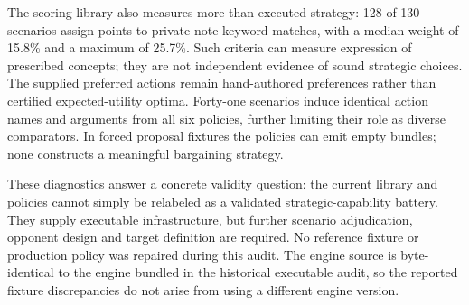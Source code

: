 The scoring library also measures more than executed strategy: 128 of 130 scenarios assign points to private-note keyword matches, with a median weight of 15.8\% and a maximum of 25.7\%. Such criteria can measure expression of prescribed concepts; they are not independent evidence of sound strategic choices. The supplied preferred actions remain hand-authored preferences rather than certified expected-utility optima. Forty-one scenarios induce identical action names and arguments from all six policies, further limiting their role as diverse comparators. In forced proposal fixtures the policies can emit empty bundles; none constructs a meaningful bargaining strategy.

These diagnostics answer a concrete validity question: the current library and policies cannot simply be relabeled as a validated strategic-capability battery. They supply executable infrastructure, but further scenario adjudication, opponent design and target definition are required. No reference fixture or production policy was repaired during this audit. The engine source is byte-identical to the engine bundled in the historical executable audit, so the reported fixture discrepancies do not arise from using a different engine version.

